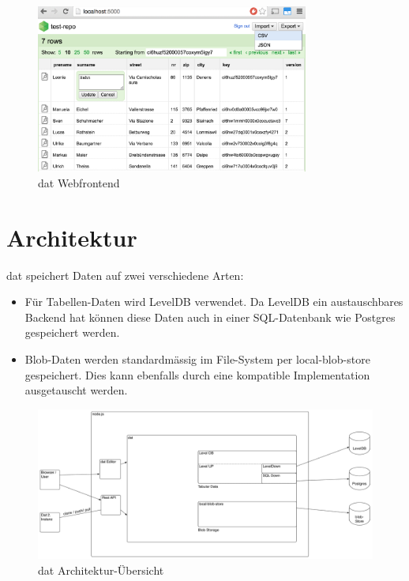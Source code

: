 \begin{figure}[H]
  \centering
  \includegraphics[width=0.8\textwidth]{fig/webfrontend}
  \caption{dat Webfrontend}
  \label{fig:dat:webfrontend}
\end{figure}


\section{Architektur}


dat speichert Daten auf zwei verschiedene Arten:
\begin{itemize}
\item Für Tabellen-Daten wird LevelDB verwendet. Da LevelDB ein austauschbares Backend hat können diese Daten auch in einer SQL-Datenbank wie Postgres gespeichert werden.
\item Blob-Daten werden standardmässig im File-System per local-blob-store gespeichert. Dies kann ebenfalls durch eine kompatible Implementation ausgetauscht werden.
\end{itemize}

\begin{figure}[H]
  \centering
  \includegraphics[width=\linewidth,clip]{fig/dat-architecture}
  \caption{dat Architektur-Übersicht}
  \label{fig:dat-architecture-overview}
\end{figure}

